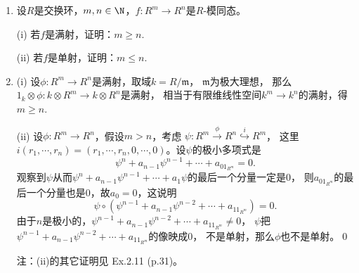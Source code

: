 \begin{enumerate}
\item[5.8] 设$R$是交换环，$m,n\in\N$，$f:R^m\to R^n$是$R$-模同态。

(i) 若$f$是满射，证明：$m\ge n$.

(ii) 若$f$是单射，证明：$m\le n$.
\item[\textbf{证明:}]
(i) 设$\phi\colon R^m\to R^n$是满射，取域$k=R/\mathfrak{m}$，
    $\mathfrak{m}$为极大理想，
    那么$1_k\otimes\phi\colon k\otimes R^m\to k\otimes R^n$是满射，
    相当于有限维线性空间$k^m\to k^n$的满射，得$m\ge n$.

(ii) 设$\phi\colon R^m\to R^n$，假设$m>n$，考虑
$\psi\colon R^m\stackrel{\phi}{\rightarrow}R^n\stackrel{i}{\hookrightarrow}R^m$，
这里$i(r_1,\cdots,r_n)=(r_1,\cdots,r_n,0,\cdots,0)$。设$\psi$的极小多项式是
$$\psi^n+a_{n-1}\psi^{n-1}+\cdots+a_01_{R^m}=0.$$
观察到$\psi$从而$\psi^n+a_{n-1}\psi^{n-1}+\cdots+a_1\psi$的最后一个分量一定是$0$，
则$a_01_{R^m}$的最后一个分量也是$0$，故$a_0=0$，这说明
$$\psi\circ(\psi^{n-1}+a_{n-1}\psi^{n-2}+\cdots+a_11_{R^m})=0.$$
由于$n$是极小的，$\psi^{n-1}+a_{n-1}\psi^{n-2}+\cdots+a_11_{R^m}\ne0$，
$\psi$把$\psi^{n-1}+a_{n-1}\psi^{n-2}+\cdots+a_11_{R^m}$的像映成$0$，
不是单射，那么$\phi$也不是单射。\qed

注：(ii)的其它证明见\cite{jdkc} Ex.2.11 (p.31)。
\end{enumerate}

